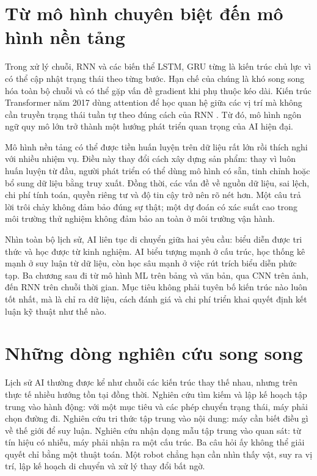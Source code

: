 \documentclass[12pt,a4paper]{report}
\begin{document}
\section{Từ mô hình chuyên biệt đến mô hình nền tảng}
Trong xử lý chuỗi, RNN và các biến thể LSTM, GRU từng là kiến trúc chủ lực vì có thể cập nhật trạng thái theo từng bước. Hạn chế của chúng là khó song song hóa toàn bộ chuỗi và có thể gặp vấn đề gradient khi phụ thuộc kéo dài. Kiến trúc Transformer năm 2017 dùng attention để học quan hệ giữa các vị trí mà không cần truyền trạng thái tuần tự theo đúng cách của RNN \cite{transformer2017}. Từ đó, mô hình ngôn ngữ quy mô lớn trở thành một hướng phát triển quan trọng của AI hiện đại.

Mô hình nền tảng có thể được tiền huấn luyện trên dữ liệu rất lớn rồi thích nghi với nhiều nhiệm vụ. Điều này thay đổi cách xây dựng sản phẩm: thay vì luôn huấn luyện từ đầu, người phát triển có thể dùng mô hình có sẵn, tinh chỉnh hoặc bổ sung dữ liệu bằng truy xuất. Đồng thời, các vấn đề về nguồn dữ liệu, sai lệch, chi phí tính toán, quyền riêng tư và độ tin cậy trở nên rõ nét hơn. Một câu trả lời trôi chảy không đảm bảo đúng sự thật; một dự đoán có xác suất cao trong môi trường thử nghiệm không đảm bảo an toàn ở môi trường vận hành.

Nhìn toàn bộ lịch sử, AI liên tục di chuyển giữa hai yêu cầu: biểu diễn được tri thức và học được từ kinh nghiệm. AI biểu tượng mạnh ở cấu trúc, học thống kê mạnh ở suy luận từ dữ liệu, còn học sâu mạnh ở việc rút trích biểu diễn phức tạp. Ba chương sau đi từ mô hình ML trên bảng và văn bản, qua CNN trên ảnh, đến RNN trên chuỗi thời gian. Mục tiêu không phải tuyên bố kiến trúc nào luôn tốt nhất, mà là chỉ ra dữ liệu, cách đánh giá và chi phí triển khai quyết định kết luận kỹ thuật như thế nào.

\section{Những dòng nghiên cứu song song}
Lịch sử AI thường được kể như chuỗi các kiến trúc thay thế nhau, nhưng trên thực tế nhiều hướng tồn tại đồng thời. Nghiên cứu tìm kiếm và lập kế hoạch tập trung vào hành động: với một mục tiêu và các phép chuyển trạng thái, máy phải chọn đường đi. Nghiên cứu tri thức tập trung vào nội dung: máy cần biết điều gì về thế giới để suy luận. Nghiên cứu nhận dạng mẫu tập trung vào quan sát: từ tín hiệu có nhiễu, máy phải nhận ra một cấu trúc. Ba câu hỏi ấy không thể giải quyết chỉ bằng một thuật toán. Một robot chẳng hạn cần nhìn thấy vật, suy ra vị trí, lập kế hoạch di chuyển và xử lý thay đổi bất ngờ.
\end{document}
